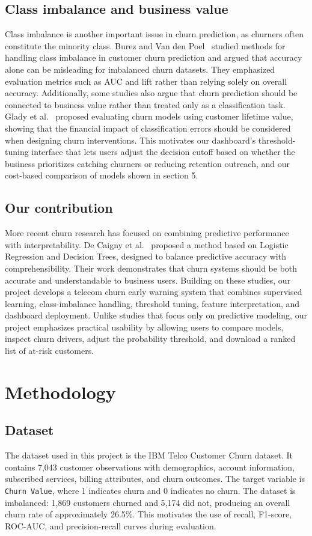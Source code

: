 \documentclass{article}
\begin{document}
\subsection{Class imbalance and business value}
Class imbalance is another important issue in churn prediction, as churners often constitute the minority class. Burez and Van den Poel~\cite{burez2009} studied methods for handling class imbalance in customer churn prediction and argued that accuracy alone can be misleading for imbalanced churn datasets. They emphasized evaluation metrics such as AUC and lift rather than relying solely on overall accuracy. Additionally, some studies also argue that churn prediction should be connected to business value rather than treated only as a classification task. Glady et al.~\cite{glady2009} proposed evaluating churn models using customer lifetime value, showing that the financial impact of classification errors should be considered when designing churn interventions. This motivates our dashboard's threshold-tuning interface that lets users adjust the decision cutoff based on whether the business prioritizes catching churners or reducing retention outreach, and our cost-based comparison of models shown in section 5. 

\subsection{Our contribution}
More recent churn research has focused on combining predictive performance with interpretability. De Caigny et al.~\cite{decaigny2018} proposed a method based on Logistic Regression and Decision Trees, designed to balance predictive accuracy with comprehensibility. Their work demonstrates that churn systems should be both accurate and understandable to business users. Building on these studies, our project develops a telecom churn early warning system that combines supervised learning, class-imbalance handling, threshold tuning, feature interpretation, and dashboard deployment. Unlike studies that focus only on predictive modeling, our project emphasizes practical usability by allowing users to compare models, inspect churn drivers, adjust the probability threshold, and download a ranked list of at-risk customers.

\section{Methodology}
\subsection{Dataset}
The dataset used in this project is the IBM Telco Customer Churn dataset. It contains 7,043 customer observations with demographics, account information, subscribed services, billing attributes, and churn outcomes. The target variable is \texttt{Churn Value}, where 1 indicates churn and 0 indicates no churn. The dataset is imbalanced: 1,869 customers churned and 5,174 did not, producing an overall churn rate of approximately 26.5\%. This motivates the use of recall, F1-score, ROC-AUC, and precision-recall curves during evaluation.
\end{document}
